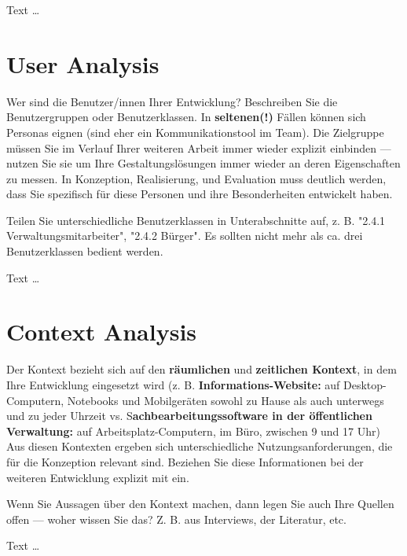 \documentclass[11pt,a4paper,english]{scrreprt}
\newenvironment{comment}
  {\par\medskip
   \begingroup\color{olive}%
   }
 {\endgroup
  \medskip}
\begin{document}
Text \dots

\section{User Analysis}
\begin{comment}
Wer sind die Benutzer/innen Ihrer Entwicklung? Beschreiben Sie die Benutzergruppen oder Benutzerklassen. In \textbf{seltenen(!)} Fällen können sich Personas eignen (sind eher ein Kommunikationstool im Team). Die Zielgruppe müssen Sie im Verlauf Ihrer weiteren Arbeit immer wieder explizit einbinden — nutzen Sie sie um Ihre Gestaltungslösungen immer wieder an deren Eigenschaften zu messen. In Konzeption, Realisierung, und Evaluation muss deutlich werden, dass Sie spezifisch für diese Personen und ihre Besonderheiten entwickelt haben.

Teilen Sie unterschiedliche Benutzerklassen in Unterabschnitte auf, z. B. "2.4.1 Verwaltungsmitarbeiter", "2.4.2 Bürger". Es sollten nicht mehr als ca. drei Benutzerklassen bedient werden.
\end{comment}

Text \dots

\section{Context Analysis}
\begin{comment}
Der Kontext bezieht sich auf den \textbf{räumlichen} und \textbf{zeitlichen Kontext}, in dem Ihre Entwicklung eingesetzt wird (z. B. \textbf{Informations-Website:} auf Desktop-Computern, Notebooks und Mobilgeräten sowohl zu Hause als auch unterwegs und zu jeder Uhrzeit vs. S\textbf{achbearbeitungssoftware in der öffentlichen Verwaltung:} auf Arbeitsplatz-Computern, im Büro, zwischen 9 und 17 Uhr) Aus diesen Kontexten ergeben sich unterschiedliche Nutzungsanforderungen, die für die Konzeption relevant sind. Beziehen Sie diese Informationen bei der weiteren Entwicklung explizit mit ein.

Wenn Sie Aussagen über den Kontext machen, dann legen Sie auch Ihre Quellen offen — woher wissen Sie das? Z. B. aus Interviews, der Literatur, etc.
\end{comment}

Text \dots
\end{document}
